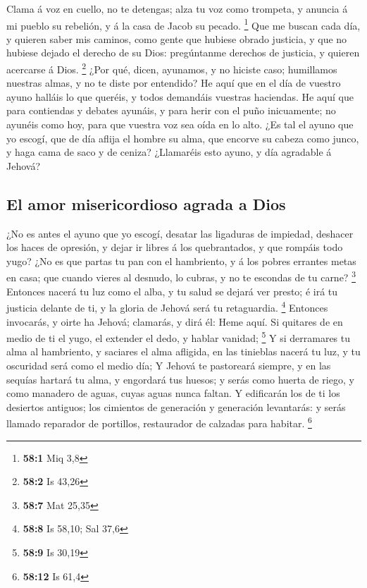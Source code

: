  Clama á voz en cuello, no te detengas; alza tu voz como
trompeta, y anuncia á mi pueblo su rebelión, y á la casa de Jacob su
pecado. \footnote{\textbf{58:1} Miq 3,8}  Que me buscan
cada día, y quieren saber mis caminos, como gente que hubiese obrado
justicia, y que no hubiese dejado el derecho de su Dios: pregúntanme
derechos de justicia, y quieren acercarse á Dios. \footnote{\textbf{58:2}
  Is 43,26}  ¿Por qué, dicen, ayunamos, y no hiciste caso;
humillamos nuestras almas, y no te diste por entendido? He aquí que en
el día de vuestro ayuno halláis lo que queréis, y todos demandáis
vuestras haciendas.  He aquí que para contiendas y debates
ayunáis, y para herir con el puño inicuamente; no ayunéis como hoy, para
que vuestra voz sea oída en lo alto.  ¿Es tal el ayuno que
yo escogí, que de día aflija el hombre su alma, que encorve su cabeza
como junco, y haga cama de saco y de ceniza? ¿Llamaréis esto ayuno, y
día agradable á Jehová?

\hypertarget{el-amor-misericordioso-agrada-a-dios}{%
\subsection{El amor misericordioso agrada a
Dios}\label{el-amor-misericordioso-agrada-a-dios}}

 ¿No es antes el ayuno que yo escogí, desatar las
ligaduras de impiedad, deshacer los haces de opresión, y dejar ir libres
á los quebrantados, y que rompáis todo yugo?  ¿No es que
partas tu pan con el hambriento, y á los pobres errantes metas en casa;
que cuando vieres al desnudo, lo cubras, y no te escondas de tu carne?
\footnote{\textbf{58:7} Mat 25,35}  Entonces nacerá tu luz
como el alba, y tu salud se dejará ver presto; é irá tu justicia delante
de ti, y la gloria de Jehová será tu retaguardia. \footnote{\textbf{58:8}
  Is 58,10; Sal 37,6}  Entonces invocarás, y oirte ha
Jehová; clamarás, y dirá él: Heme aquí. Si quitares de en medio de ti el
yugo, el extender el dedo, y hablar vanidad; \footnote{\textbf{58:9} Is
  30,19}  Y si derramares tu alma al hambriento, y
saciares el alma afligida, en las tinieblas nacerá tu luz, y tu
oscuridad será como el medio día;  Y Jehová te pastoreará
siempre, y en las sequías hartará tu alma, y engordará tus huesos; y
serás como huerta de riego, y como manadero de aguas, cuyas aguas nunca
faltan.  Y edificarán los de ti los desiertos antiguos;
los cimientos de generación y generación levantarás: y serás llamado
reparador de portillos, restaurador de calzadas para habitar.
\footnote{\textbf{58:12} Is 61,4}

